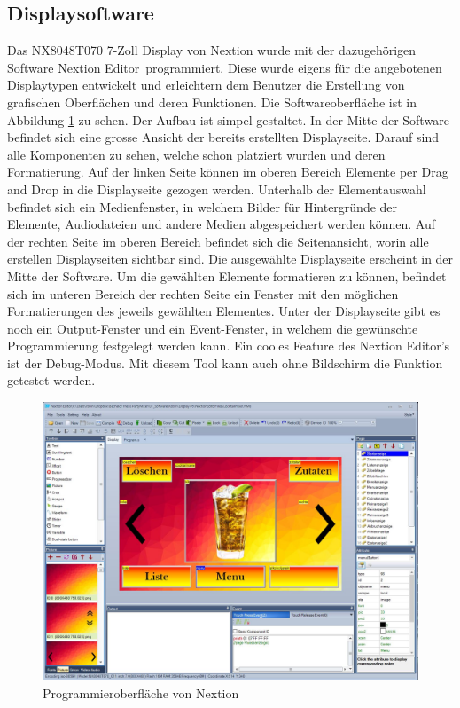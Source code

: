 \subsection{Displaysoftware}
\label{subsec:Software_Display}

Das NX8048T070 7-Zoll Display von Nextion wurde mit der dazugehörigen Software \flqq Nextion Editor\frqq~programmiert. Diese wurde eigens für die angebotenen Displaytypen entwickelt und erleichtern dem Benutzer die Erstellung von grafischen Oberflächen und deren Funktionen. Die Softwareoberfläche ist in Abbildung \ref{fig:NextionEditor} zu sehen. Der Aufbau ist simpel gestaltet. In der Mitte der Software befindet sich eine grosse Ansicht der bereits erstellten Displayseite. Darauf sind alle Komponenten zu sehen, welche schon platziert wurden und deren Formatierung. Auf der linken Seite können im oberen Bereich Elemente per Drag and Drop in die Displayseite gezogen werden. Unterhalb der Elementauswahl befindet sich ein Medienfenster, in welchem Bilder für Hintergründe der Elemente, Audiodateien und andere Medien abgespeichert werden können. Auf der rechten Seite im oberen Bereich befindet sich die Seitenansicht, worin alle erstellen Displayseiten sichtbar sind. Die ausgewählte Displayseite erscheint in der Mitte der Software. Um die gewählten Elemente formatieren zu können, befindet sich im unteren Bereich der rechten Seite ein Fenster mit den möglichen Formatierungen des jeweils gewählten Elementes. Unter der Displayseite gibt es noch ein Output-Fenster und ein Event-Fenster, in welchem die gewünschte Programmierung festgelegt werden kann. Ein cooles Feature des Nextion Editor's ist der Debug-Modus. Mit diesem Tool kann auch ohne Bildschirm die Funktion getestet werden. \cite{patrick_nx8048t070_nodate} \cite{zhou_nextion_nodate}

\begin{figure}[h!]
	\centering
	\includegraphics[width=\textwidth]{graphics/NextionEditor}
	\caption{Programmieroberfläche von Nextion \cite{zhou_nextion_nodate} \cite{pngimgcom_cocktail_nodate-7}}
	\label{fig:NextionEditor}
\end{figure}

\newpage
 


